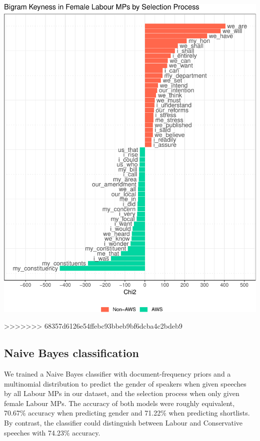 \documentclass[]{article}
\let\origfigure\figure
\let\endorigfigure\endfigure
\renewenvironment{figure}[1][2] {
    \expandafter\origfigure\expandafter[H]
} {
    \endorigfigure
}
\theoremstyle{definition}
\theoremstyle{definition}
\theoremstyle{definition}
\theoremstyle{remark}
\begin{document}
\begin{table}[H]
\begin{table}[H]
\begin{table}[H]
\begin{table}[H]
\begin{table}[H]
\begin{table}[H]
\begin{table}[H]
\begin{table}[H]
\begin{figure}
\begin{figure}
\centering
\includegraphics{methodology_files/figure-latex/bigrams-short-list-keyness-1.pdf}
\caption{\label{bigrams-keyness}Bigram Keyness in Female Labour MPs by
Selection Process}
>>>>>>> 68357d6126e54ffebc93bbeb9bf6dcba4c2bdeb9
\end{figure}

\hypertarget{naive-bayes-classification}{%
\subsection{Naive Bayes
classification}\label{naive-bayes-classification}}

We trained a Naive Bayes classifier with document-frequency priors and a
multinomial distribution to predict the gender of speakers when given
speeches by all Labour MPs in our dataset, and the selection process
when only given female Labour MPs. The accuracy of both models were
roughly equivalent, 70.67\% accuracy when predicting gender and 71.22\%
when predicting shortlists. By contrast, the classifier could
distinguish between Labour and Conservative speeches with 74.23\%
accuracy.


\end{figure}
\end{table}
\end{table}
\end{table}
\end{table}
\end{table}
\end{table}
\end{table}
\end{table}
\end{document}
